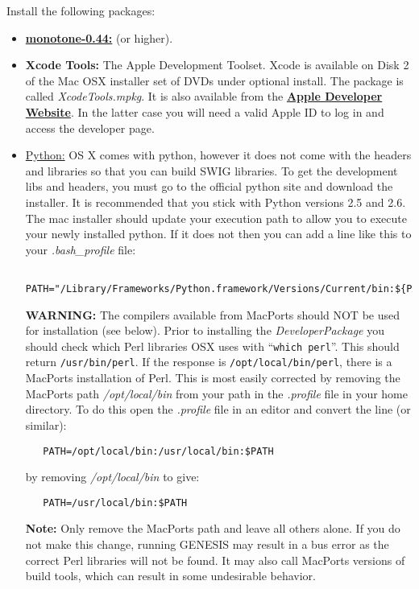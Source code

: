 \documentclass[12pt]{article}
\begin{document}
Install the following packages:
\begin{itemize}
   \item[]\href{http://monotone.ca/}{\bf monotone-0.44:} (or higher).
   \item[]{\bf Xcode Tools:} The Apple Development Toolset. Xcode is available on Disk 2 of the Mac OSX installer set of DVDs under optional install. The package is called {\it  XcodeTools.mpkg}. It is also available from the \href{http://developer.apple.com/technology/xcode.html}{\bf Apple Developer Website}. In the latter case  you will need a valid Apple ID to log in and access the developer page.
   
  \item[]\href{http://python.org/}{Python:} OS X comes with python, however it does not come with the headers and libraries so that you can build SWIG libraries. To get the development libs and headers, you must go to the official python site and download the installer. It is recommended that you stick with Python versions 2.5 and 2.6. The mac installer should update your execution path to allow you to execute your newly installed python. If it does not then you can add a line like this to your {\it .bash\_profile} file:
  
 \begin{verbatim}
    PATH="/Library/Frameworks/Python.framework/Versions/Current/bin:${PATH}"
 \end{verbatim}
   
   {\bf WARNING:} The compilers available from MacPorts should NOT be used for installation (see below). Prior to installing the {\it DeveloperPackage} you should check which Perl libraries OSX uses with ``{\tt  which perl}''. This should return {\tt  /usr/bin/perl}. If the response is {\tt /opt/local/bin/perl}, there is a MacPorts installation of Perl. This is most easily corrected by removing the MacPorts path {\it /opt/local/bin} from your path in the {\it .profile} file in your home directory. To do this open the  {\it .profile} file in an editor and convert the line (or similar):
\begin{verbatim}
   PATH=/opt/local/bin:/usr/local/bin:$PATH
\end{verbatim}
by removing {\it /opt/local/bin} to give:
\begin{verbatim}
   PATH=/usr/local/bin:$PATH
\end{verbatim}
{\bf Note:} Only remove the MacPorts path and leave all others alone. If you do not make this change, running GENESIS may result in a bus error as the correct Perl libraries will not be found. It may also call MacPorts versions of build tools, which can result in some undesirable behavior.  


\end{itemize}
\end{document}
